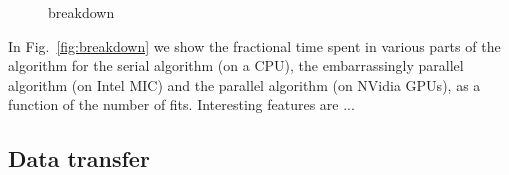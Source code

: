 \documentclass[letterpaper]{jpconf}
\begin{document}
\begin{figure}[!t]
\centering
{}
\hspace{1mm}
\caption{breakdown}
\end{figure}



In Fig.~\ref{fig:breakdown} we show the fractional time spent in
various parts of the algorithm for the serial algorithm (on a CPU),
the embarrassingly parallel algorithm (on Intel MIC) and the parallel
algorithm (on NVidia GPUs), as a function of the number of
fits. Interesting features are ...

\subsection{Data transfer}
\end{document}
